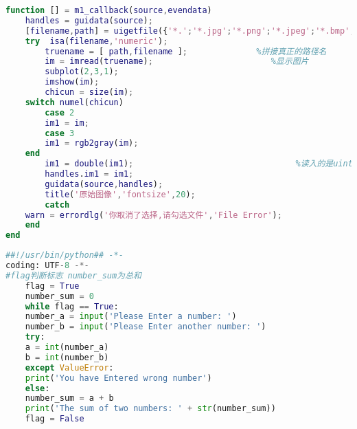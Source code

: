 \Appendix																   %

\begin{lstlisting}[language=MATLAB]
function [] = m1_callback(source,evendata)
	handles = guidata(source);
	[filename,path] = uigetfile({'*.';'*.jpg';'*.png';'*.jpeg';'*.bmp';;},'选择图片');
	try  isa(filename,'numeric');                       
		truename = [ path,filename ];              %拼接真正的路径名
		im = imread(truename);                        %显示图片
		subplot(2,3,1);                         
		imshow(im);
		chicun = size(im);
	switch numel(chicun)
		case 2
		im1 = im;
		case 3
		im1 = rgb2gray(im);
	end
		im1 = double(im1);                                 %读入的是uint8类型，要转double才能计算
		handles.im1 = im1;
		guidata(source,handles);
		title('原始图像','fontsize',20);
		catch
	warn = errordlg('你取消了选择,请勾选文件','File Error');
	end
end
\end{lstlisting}

\begin{lstlisting}[language = python]
##!/usr/bin/python## -*- 
coding: UTF-8 -*-
#flag判断标志 number_sum为总和
	flag = True
	number_sum = 0
	while flag == True:   
	number_a = input('Please Enter a number: ')    
	number_b = input('Please Enter another number: ')  
	try:          
	a = int(number_a)  
	b = int(number_b)   
	except ValueError:        
	print('You have Entered wrong number')    
	else:        
	number_sum = a + b     
	print('The sum of two numbers: ' + str(number_sum))
	flag = False
\end{lstlisting}
